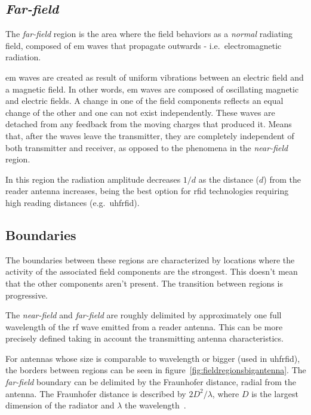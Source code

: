 \subsection{\emph{Far-field}}

The \emph{far-field} region is the area where the field behaviors as a \textit{normal} radiating field, composed of \ac{em} waves that propagate outwards - i.e.\ electromagnetic radiation.

\ac{em} waves are created as result of uniform vibrations between an electric field and a magnetic field. In other words, \ac{em} waves are composed of oscillating magnetic and electric fields. A change in one of the field components reflects an equal change of the other and one can not exist independently.
These waves are detached from any feedback from the moving charges that produced it. Means that, after the waves leave the transmitter, they are completely independent of both transmitter and receiver, as opposed to the phenomena in the \emph{near-field} region.

In this region the radiation amplitude decreases $1/d$ as the distance ($d$) from the reader antenna increases, being the best option for \ac{rfid} technologies requiring high reading distances (e.g.\ \ac{uhfrfid}).

\subsection{Boundaries}

The boundaries between these regions are characterized by locations where the activity of the associated field components are the strongest. This doesn't mean that the other components aren't present. The transition between regions is progressive.

The \emph{near-field} and \emph{far-field} are roughly delimited by approximately one full wavelength of the \ac{rf} wave emitted from a reader antenna.
This can be more precisely defined taking in account the transmitting antenna characteristics.

For antennas whose size is comparable to wavelength or bigger (used in \ac{uhfrfid}), the borders between regions can be seen in figure~\ref{fig:fieldregionsbigantenna}. The \emph{far-field} boundary can be delimited by the Fraunhofer distance, radial from the antenna. The Fraunhofer distance is described by $2D^2 / \lambda$, where $D$ is the largest dimension of the radiator and $\lambda$ the wavelength~\cite{balanisAntennaTheoryAnalysis2005}.

